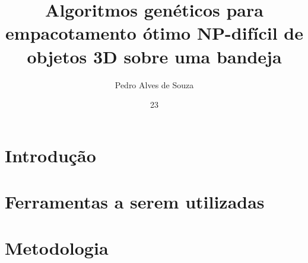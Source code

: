 \documentclass[tg]{ita}    %
\author{Pedro Alves de Souza}{Neto}
\title{Algoritmos genéticos para empacotamento ótimo NP-difícil de objetos 3D sobre uma bandeja}
\date{23}{junho}{2021}
\begin{document}


\mainmatter

\chapter{Introdução}\label{cap:introduction}


\chapter{Ferramentas a serem utilizadas}\label{cap:tools}


\chapter{ Metodologia }\label{cap:proposal}


\renewcommand\bibname{\itareferencesnamebabel} %


\annex
% 

% 

% 

\end{document}
